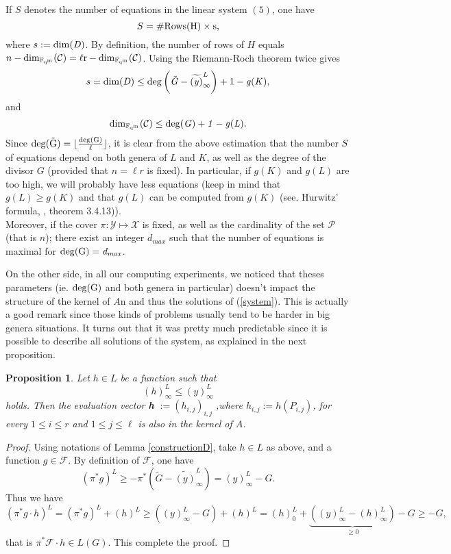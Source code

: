 \documentclass[10pt]{article}
\newtheorem{prop1}[thm]{Proposition}
\newcommand{\s}{\vspace{0.3cm}}
\newcommand{\cd}{\cdot}
\newcommand{\fqm}{\mathbb{F}_{q^m}}
\newcommand{\X}{\mathcal{X}}
\newcommand{\Y}{\mathcal{Y}}
\newcommand{\PR}{\mathcal{P}}
\begin{document}
\s 

If $S$ denotes the number of equations in the linear system $(5)$, one have 
\[S = \#\rm{Rows}(H) \times s,\]
where $s := \rm \dim(\it D)$. By definition, the number of rows of $H$ equals $n-\rm dim_{\fqm}(\mathcal{C})= \ell r - \rm dim_{\fqm}(\mathcal{C})$. Using the Riemann-Roch theorem  twice gives 
\[s = \rm dim (\it D) \leq \rm{deg}\left(\it \tilde{G}-\widetilde{(y)}^L_{\infty}\right) +1 - \it g(K) ,\]
and
\[\rm dim_{\fqm}(\mathcal{C}) \leq \rm{deg}\it(G)+1-g(L).\]
Since $\rm{deg}(\tilde{G}) = \lfloor \frac{\rm{deg}(G)}{\ell} \rfloor$, it is clear from the above estimation that the number $S$ of equations depend on both genera of $L$ and $K$, as well as the degree of the divisor $G$ (provided that $n=\ell r$ is fixed). In particular, if $g(K)$ and $g(L)$ are too high, we will probably have less equations (keep in mind that $g(L) \geq g(K)$ and that $g(L)$ can be computed from $g(K)$ (see. Hurwitz' formula, \cite{Sti}, theorem 3.4.13)). \\
Moreover, if the cover $\pi : \Y \longmapsto \X$ is fixed, as well as the cardinality of the set $\PR$ (that is $n$); there exist an integer $d_{max}$ such that the number of equations is maximal for $\rm{deg}(G)= \it d_{max}$. 

\s

On the other side, in all our computing experiments, we noticed that theses parameters (ie. $\rm{deg}(G)$ and both genera in particular) doesn't impact the structure of the kernel of $A$n and thus the solutions of (\ref{system}). This is actually a good remark since those kinds of problems usually tend to be harder in big genera situations. It turns out that it was pretty much predictable since it is possible to describe all solutions of the system, as explained in the next proposition. 

\s

\begin{prop1} \label{othersolutions}
Let $h \in L$ be a function such that 
\[ (h)^L_{\infty} \leq (y)^L_{\infty}\]
holds. Then the evaluation vector \textbf{h} $ := (h_{i,j})_{i,j}$ ,where $h_{i,j} := h(P_{i,j})$, for every $1 \leq i \leq r$ and $1 \leq j \leq \ell$ is also in the kernel of $A$.
\end{prop1}

\s

\begin{proof}
Using notations of Lemma \ref{constructionD}, take $h \in L$ as above, and a function $g \in \mathcal{F}$. By definition of $\mathcal{F}$, one have 
\[(\pi^*g)^L \geq -\pi^*\left(\tilde{G}-\widetilde{(y)}^L_{\infty}\right) = (y)^L_{\infty} - G.\]
Thus we have 
\[(\pi^*g \cd h)^L = (\pi^*g)^L  + (h)^L \geq  ((y)^L_{\infty} - G)+(h)^L = (h)^L_0 + \underbrace{((y)^L_{\infty}-(h)^L_{\infty})}_{\geq 0} - G \geq -G,\]
that is $\pi^*\mathcal{F}\cd h \in L(G)$. This complete the proof.

\end{proof}
\end{document}
